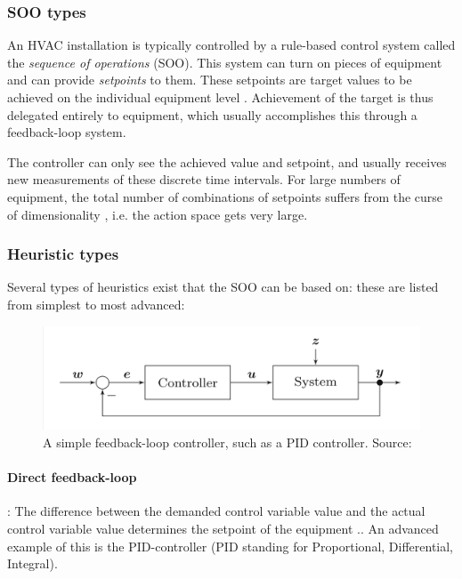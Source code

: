 \documentclass{article}
\theoremstyle{definition}
\theoremstyle{remark}
\begin{document}
\subsubsection{SOO types}
An HVAC installation is typically controlled by a rule-based control system called the \textit{sequence of operations} (SOO). This system can turn on pieces of equipment and can provide \textit{setpoints} to them. These setpoints are target values to be achieved on the individual equipment level \cite{luo2022controlling}. Achievement of the target is thus delegated entirely to equipment, which usually accomplishes this through a feedback-loop system. 

The controller can only see the achieved value and setpoint, and usually receives new measurements of these discrete time intervals. For large numbers of equipment, the total number of combinations of setpoints suffers from the curse of dimensionality \cite{luo2022controlling}, i.e. the action space gets very large. 

\subsubsection{Heuristic types}
Several types of heuristics exist that the SOO can be based on: these are listed from simplest to most advanced:

\FloatBarrier
\begin{figure}
    \centering
    \includegraphics{feedbackloop.png}
    \caption{A simple feedback-loop controller, such as a PID controller. Source: \cite{Schwenzer_Ay_Bergs_Abel_2021}}
    \label{fig:my_label}
\end{figure}


\paragraph{Direct feedback-loop}: The difference between the demanded control variable value and the actual control variable value determines the setpoint of the equipment \cite{Schwenzer_Ay_Bergs_Abel_2021}.. An advanced example of this is the PID-controller (PID standing for Proportional, Differential, Integral).
\end{document}
